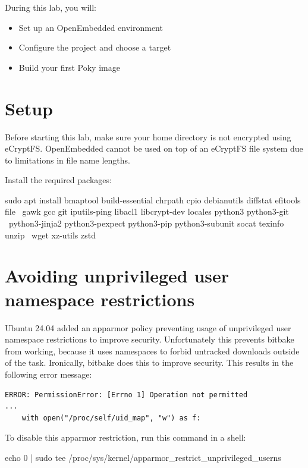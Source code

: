 
During this lab, you will:
\begin{itemize}
  \item Set up an OpenEmbedded environment
  \item Configure the project and choose a target
  \item Build your first Poky image
\end{itemize}

\section{Setup}

Before starting this lab, make sure your home directory is not
encrypted using eCryptFS. OpenEmbedded cannot be used on top of an eCryptFS file
system due to limitations in file name lengths.

Install the required packages:
\begin{bashinput}
sudo apt install bmaptool build-essential chrpath cpio debianutils diffstat efitools file \
	gawk gcc git iputils-ping libacl1 libcrypt-dev locales python3 python3-git \
	python3-jinja2 python3-pexpect python3-pip python3-subunit socat texinfo unzip \
	wget xz-utils zstd
\end{bashinput}

\section{Avoiding unprivileged user namespace restrictions}

Ubuntu 24.04 added an apparmor policy preventing usage of unprivileged user
namespace restrictions to improve security. Unfortunately this prevents
bitbake from working, because it uses namespaces to forbid untracked
downloads outside of the \code{do_fetch} task. Ironically, bitbake does
this to improve security. This results in the following error message:

\begin{verbatim}
ERROR: PermissionError: [Errno 1] Operation not permitted
...
    with open("/proc/self/uid_map", "w") as f:
\end{verbatim}

To disable this apparmor restriction, run this command in a shell:

\begin{bashinput}
echo 0 | sudo tee /proc/sys/kernel/apparmor_restrict_unprivileged_userns
\end{bashinput}

